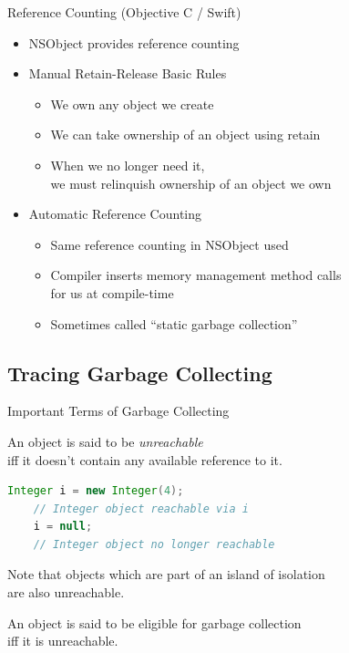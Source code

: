 \begin{Frame}{Reference Counting (Objective C / Swift)}
  \begin{itemize}
    \item NSObject provides reference counting
    \item Manual Retain-Release Basic Rules
      \begin{itemize}
        \item We own any object we create
        \item We can take ownership of an object using retain
        \item When we no longer need it,\\
          we must relinquish ownership of an object we own
      \end{itemize}
    \item Automatic Reference Counting
      \begin{itemize}
        \item Same reference counting in NSObject used
        \item Compiler inserts memory management method calls\\
          for us at compile-time
        \item Sometimes called \enquote{static garbage collection}
      \end{itemize}
  \end{itemize}
\end{Frame}

\subsection{Tracing Garbage Collecting}

\begin{Frame}[fragile]{Important Terms of Garbage Collecting}
  \begin{Definition}
    An object is said to be \emph{unreachable}\\ iff it doesn't contain any available reference to it.
  \end{Definition}

  \begin{lstlisting}[language=Java,gobble=4]
    Integer i = new Integer(4);
    // Integer object reachable via i
    i = null;
    // Integer object no longer reachable
  \end{lstlisting}

  Note that objects which are part of an \alert{island of isolation}\\
  are also unreachable.

  \begin{Definition}
    An object is said to be eligible for garbage collection\\ iff it is unreachable.
  \end{Definition}
\end{Frame}

